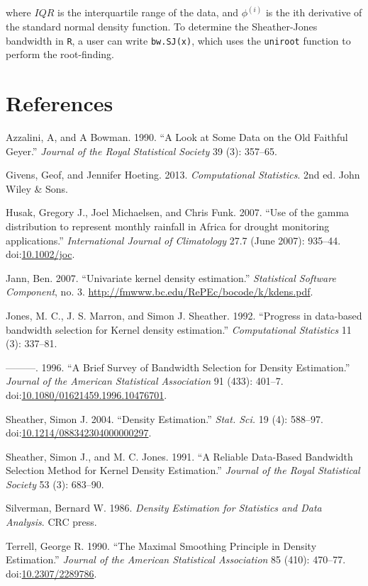 \documentclass[]{article}
\begin{document}
where \(IQR\) is the interquartile range of the data, and \(\phi^{(i)}\)
is the ith derivative of the standard normal density function. To
determine the Sheather-Jones bandwidth in \texttt{R}, a user can write
\texttt{bw.SJ(x)}, which uses the \texttt{uniroot} function to perform
the root-finding.

\section*{References}\label{references}

\hypertarget{refs}{}
\hypertarget{ref-Bowman1990}{}
Azzalini, A, and A Bowman. 1990. ``A Look at Some Data on the Old
Faithful Geyer.'' \emph{Journal of the Royal Statistical Society} 39
(3): 357--65.

\hypertarget{ref-Givens2013}{}
Givens, Geof, and Jennifer Hoeting. 2013. \emph{Computational
Statistics}. 2nd ed. John Wiley \& Sons.

\hypertarget{ref-Husak2007}{}
Husak, Gregory J., Joel Michaelsen, and Chris Funk. 2007. ``Use of the
gamma distribution to represent monthly rainfall in Africa for drought
monitoring applications.'' \emph{International Journal of Climatology}
27.7 (June 2007): 935--44.
doi:\href{https://doi.org/10.1002/joc}{10.1002/joc}.

\hypertarget{ref-Jann2007}{}
Jann, Ben. 2007. ``Univariate kernel density estimation.''
\emph{Statistical Software Component}, no. 3.
\url{http://fmwww.bc.edu/RePEc/bocode/k/kdens.pdf}.

\hypertarget{ref-Jones1992}{}
Jones, M. C., J. S. Marron, and Simon J. Sheather. 1992. ``Progress in
data-based bandwidth selection for Kernel density estimation.''
\emph{Computational Statistics} 11 (3): 337--81.

\hypertarget{ref-Jones1996}{}
---------. 1996. ``A Brief Survey of Bandwidth Selection for Density
Estimation.'' \emph{Journal of the American Statistical Association} 91
(433): 401--7.
doi:\href{https://doi.org/10.1080/01621459.1996.10476701}{10.1080/01621459.1996.10476701}.

\hypertarget{ref-Sheather2004}{}
Sheather, Simon J. 2004. ``Density Estimation.'' \emph{Stat. Sci.} 19
(4): 588--97.
doi:\href{https://doi.org/10.1214/088342304000000297}{10.1214/088342304000000297}.

\hypertarget{ref-Sheather1991}{}
Sheather, Simon J., and M. C. Jones. 1991. ``A Reliable Data-Based
Bandwidth Selection Method for Kernel Density Estimation.''
\emph{Journal of the Royal Statistical Society} 53 (3): 683--90.

\hypertarget{ref-Silverman1986}{}
Silverman, Bernard W. 1986. \emph{Density Estimation for Statistics and
Data Analysis}. CRC press.

\hypertarget{ref-Terrell1990}{}
Terrell, George R. 1990. ``The Maximal Smoothing Principle in Density
Estimation.'' \emph{Journal of the American Statistical Association} 85
(410): 470--77.
doi:\href{https://doi.org/10.2307/2289786}{10.2307/2289786}.
\end{document}

